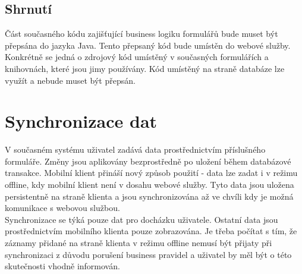 \documentclass{diplomka}
\begin{document}
\subsection{Shrnutí}
Část současného kódu zajišťující business logiku formulářů bude muset být přepsána do jazyka Java. Tento přepsaný kód bude umístěn do webové služby. Konkrétně se jedná o zdrojový kód umístěný v současných formulářích a knihovnách, které jsou jimy používány. Kód umístěný na straně databáze lze využít a nebude muset být přepsán.

\newpage
\section{Synchronizace dat}
V současném systému uživatel zadává data prostřednictvím příslušného formuláře. Změny jsou aplikovány bezprostředně po uložení během databázové transakce. Mobilní klient přináší nový způsob použití - data lze zadat i v režimu offline, kdy mobilní klient není v dosahu webové služby. Tyto data jsou uložena persistentně na straně klienta a jsou synchronizována až ve chvíli kdy je možná komunikace s webovou službou.\\ \indent
Synchronizace se týká pouze dat pro docházku uživatele. Ostatní data jsou prostřednictvím mobilního klienta pouze zobrazována. Je třeba počítat s tím, že záznamy přidané na straně klienta v režimu offline nemusí být přijaty při synchronizaci z důvodu porušení business pravidel a uživatel by měl být o této skutečnosti vhodně informován.
\end{document}
